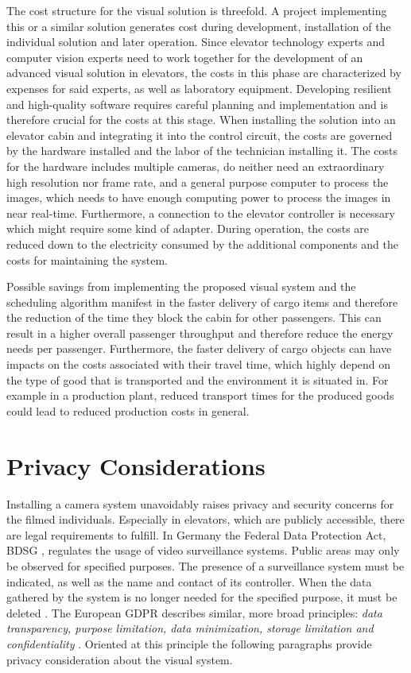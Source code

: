 The cost structure for the visual solution is threefold. 
A project implementing this or a similar solution generates cost during development, installation of the individual solution and later operation.
Since elevator technology experts and computer vision experts need to work together for the development of an advanced visual solution in elevators, 
the costs in this phase are characterized by expenses for said experts, as well as laboratory equipment.
Developing resilient and high-quality software requires careful planning and implementation and is therefore crucial for the costs at this stage.
When installing the  solution into an elevator cabin and integrating it into the control circuit, the costs are governed by the hardware installed and the labor of the technician installing it. 
The costs for the hardware includes multiple cameras, do neither need an extraordinary high resolution nor frame rate, and a general purpose computer to process the images, which needs to have enough computing power to process the images in near real-time. 
Furthermore, a connection to the elevator controller is necessary which might require some kind of adapter.
During operation, the costs are reduced down to the electricity consumed by the additional components and  the costs for maintaining the system.

Possible savings from implementing the proposed visual system and the scheduling algorithm manifest in the faster delivery of cargo items and therefore the reduction of the time they block the cabin for other passengers. 
This can result in a higher overall passenger throughput and therefore reduce the energy needs per passenger.
Furthermore, the faster delivery of cargo objects can have impacts on the costs associated with their travel time, which highly depend on the type of good that is transported and the environment it is situated in. 
For example in a production plant, reduced transport times for the produced goods could lead to reduced production costs in general.


\section{Privacy Considerations}
Installing a camera system unavoidably raises privacy and security concerns 
for the filmed individuals.
Especially in elevators, which are publicly accessible, there are legal requirements to fulfill.
In Germany the Federal Data Protection Act, \\
\ac{BDSG} \autocite[][]{bmjv2009bdsg}, 
regulates the usage of video surveillance systems.
Public areas may only be observed for specified purposes.
The presence of a surveillance system must be indicated,
as well as the name and contact of its controller. 
When the data gathered by the system is no longer needed for the specified purpose, it must be deleted 
\autocite[][§~4]{bmjv2009bdsg}.
The European \ac{GDPR} \autocite{eu2016gdpr} describes similar, more broad principles:  
\emph{data transparency, purpose limitation, data minimization, storage limitation and confidentiality}
\autocite{ico2018gdpr}.
Oriented at this principle the following paragraphs provide privacy consideration about the visual system.

